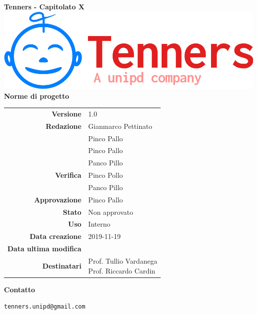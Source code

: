 \begin{titlepage}
	\begin{center}
		\large \textbf{Tenners - Capitolato X}
		\vfill
		\includegraphics[scale = 0.3]{./res/img/logo.png}\\
		\vfill
		\Huge \textbf{Norme di progetto}

        \vfill
        \large

        \begin{tabular}{r|l}
                        \textbf{Versione} & 1.0 \\
                        \textbf{Redazione} &
                        Gianmarco Pettinato\\&
                        Pinco Pallo \\&
                        Pinco Pallo \\&
                        Panco Pillo \\
                        \textbf{Verifica} &
                        Pinco Pollo \\&
                        Panco Pillo \\
                        \textbf{Approvazione} & Pinco Pallo \\
                        \textbf{Stato} & Non approvato \\
                        \textbf{Uso} &  Interno\\
                        \textbf{Data creazione} &  2019-11-19\\
                        \textbf{Data ultima modifica} &  \\
                        \textbf{Destinatari} & \parbox[t]{5cm}{Prof. Tullio Vardanega\\Prof. Riccardo Cardin}
                \end{tabular}
                \vfill
                \normalsize
                \vfill
                \textbf{Contatto}

                \texttt{tenners.unipd@gmail.com}

	\end{center}
\end{titlepage}
